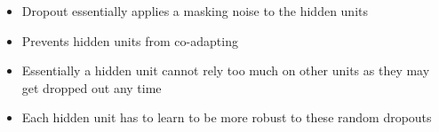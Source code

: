 \begin{frame}
\begin{columns}
		\begin{overlayarea}{\textwidth}{\textheight}
			\begin{itemize}
				\justifying
				\item Dropout essentially applies a masking noise to the hidden units
				\item<2-> Prevents hidden units from co-adapting
				\item<3-> Essentially a hidden unit cannot rely too much on other units as they may get dropped out any time
				\item<4-> Each hidden unit has to learn to be more robust to these random dropouts
			\end{itemize}
		\end{overlayarea}
	\end{columns}
\end{frame}
						

